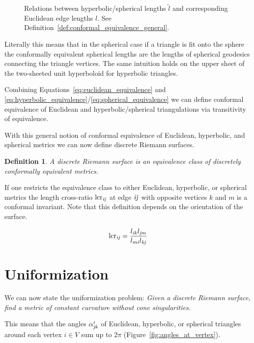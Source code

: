 \documentclass{book}
\newtheorem{definition}{Definition}
\begin{document}
\begin{figure}
\centering
\scalebox{0.5}{}
\caption[Conformal equivalence of Euclidean and hyperbolic/spherical metrics]{Relations between hyperbolic/spherical lengths $\tilde l$ and corresponding Euclidean edge lengths $l$. See Definition~\ref{def:conformal_equivalence_general}.}
\label{fig:conformal_equivalence_sph_hyp}
\end{figure}

Literally this means that in the spherical case if a triangle is fit onto the sphere the conformally equivalent spherical lengths are the lengths of spherical geodesics connecting the triangle vertices. 
The same intuition holds on the upper sheet of the two-sheeted unit hyperboloid for hyperbolic triangles.

Combining Equations~\ref{eq:euclidean_equivalence} and \ref{eq:hyperbolic_equivalence}/\ref{eq:spherical_equivalence} we can define conformal equivalence of Euclidean and hyperbolic/spherical triangulations via transitivity of equivalence.

With this general notion of conformal equivalence of Euclidean, hyperbolic, and spherical metrics we can now define discrete Riemann surfaces.

\begin{definition}
\label{def:discrete_riemann_surface}
A discrete Riemann surface is an equivalence class of discretely conformally equivalent metrics.
\end{definition}

If one restricts the equivalence class to either Euclidean, hyperbolic, or spherical metrics the length cross-ratio $\mathrm{lcr}_{\it{ij}}$ at edge $\it{ij}$ with opposite vertices $k$ and $m$ is a conformal invariant. Note that this definition depends on the orientation of the surface.

\begin{equation}
	\mathrm{lcr}_{\it{ij}} = \frac{l_{\it{ik}} l_{\it{jm}}} {l_{\it{mi}} l_{\it{kj}}} \label{eq:length_cross_ratio}
\end{equation}

\section{Uniformization}
We can now state the uniformization problem:
\emph{Given a discrete Riemann surface, find a metric of constant curvature
without cone singularities.}

This means that the angles $\alpha_{\it{jk}}^i$ of Euclidean, hyperbolic, or spherical triangles around each vertex  $i\in V$ sum up to $2\pi$ (Figure~\ref{fig:angles_at_vertex}). 
\end{document}
